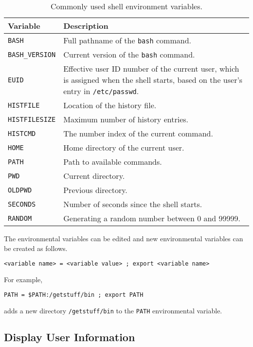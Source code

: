 \begin{table}
	\centering \caption{Commonly used shell environment variables.}\label{ch2tab:shellenvironmentvars}
	\begin{tabularx}{\textwidth}{lX}
		\hline
		Variable & Description \\ \hline
		\verb|BASH| & Full pathname of the \verb|bash| command. \\ \hdashline
		\verb|BASH_VERSION| & Current version of the \verb|bash| command. \\ \hdashline
		\verb|EUID| & Effective user ID number of the current user, which is assigned when the shell starts, based on the user's entry in \verb|/etc/passwd|. \\ \hdashline
		\verb|HISTFILE| & Location of the history file. \\ \hdashline
		\verb|HISTFILESIZE| & Maximum number of history entries. \\ \hdashline
		\verb|HISTCMD| & The number index of the current command. \\ \hdashline
		\verb|HOME| & Home directory of the current user. \\ \hdashline
		\verb|PATH| & Path to available commands. \\ \hdashline
		\verb|PWD| & Current directory. \\ \hdashline
		\verb|OLDPWD| & Previous directory. \\ \hdashline
		\verb|SECONDS| & Number of seconds since the shell starts. \\ \hdashline
		\verb|RANDOM| & Generating a random number between 0 and 99999. \\
		\hline
	\end{tabularx}
\end{table}

The environmental variables can be edited and new environmental variables can be created as follows.
\begin{verbatim}
<variable name> = <variable value> ; export <variable name>
\end{verbatim}

For example,
\begin{verbatim}
PATH = $PATH:/getstuff/bin ; export PATH
\end{verbatim}
adds a new directory \verb|/getstuff/bin| to the \verb|PATH| environmental variable.

\subsection{Display User Information}

